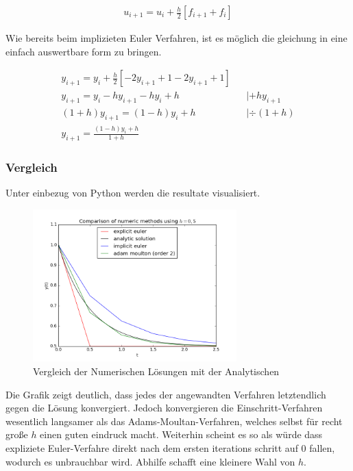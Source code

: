 \documentclass{article}
\newcommand\Section[1]{ %
  \addtocontents{toc}{\protect\setcounter{tocdepth}{0}}
  \subsubsection*{#1}
  \addtocontents{toc}{\protect\setcounter{tocdepth}{3}}}
\begin{document}
				\begin{align*}
					u_{i+1} = u_{i} + \frac{h}{2}[f_{i+1} + f_{i}]
				\end{align*}
				
				Wie bereits beim implizieten Euler Verfahren, ist es möglich die gleichung in eine einfach auswertbare form zu
				bringen.
				
				\begin{align*}
					y_{i+1} = y_{i} + \frac{h}{2}[-2y_{i+1} + 1 - 2y_{i+1} + 1] \\
					y_{i+1} = y_{i} - hy_{i+1} - hy_{i} + h && | +hy_{i+1} \\
					(1+h)y_{i+1} = (1-h)y_{i} + h && | \div(1+h) \\
					y_{i+1} = \frac{(1-h)y_{i}+h}{1+h}
				\end{align*}
				
			
			\Section{Vergleich}
			
				Unter einbezug von Python werden die resultate visualisiert.
				
				\begin{figure}[htbp] 
					\centering
					\includegraphics[width=0.7\textwidth]{numeric_plots.png}
					\caption{Vergleich der Numerischen Lösungen mit der Analytischen}
					\label{fig:Bild2}
				\end{figure}
			
				Die Grafik zeigt deutlich, dass jedes der angewandten Verfahren letztendlich gegen die Lösung konvergiert.
				Jedoch konvergieren die Einschritt-Verfahren wesentlich langsamer als das Adams-Moultan-Verfahren, welches 
				selbst für recht große $h$ einen guten eindruck macht. Weiterhin scheint es so als würde dass expliziete Euler-Verfahre direkt nach dem ersten iterations schritt auf 0 fallen, wodurch es unbrauchbar wird. Abhilfe schafft eine kleinere Wahl von $h$.
				
\end{document}
